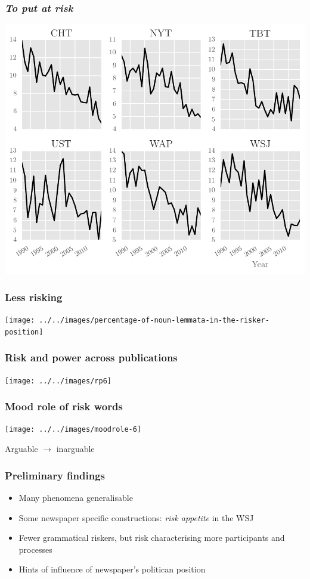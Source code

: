 \documentclass{beamer}       %
\begin{document}
\begin{frame}\frametitle{\emph{To put at risk}}
    \centering
    \includegraphics[width=1\textwidth]{../../images/to-run-risk}
\end{frame}

\begin{frame}\frametitle{Less risking}
    \centering
    \texttt{[image: ../../images/percentage-of-noun-lemmata-in-the-risker-position]}
\end{frame}

\begin{frame}\frametitle{Risk and power across publications}
    \centering
    \texttt{[image: ../../images/rp6]}
\end{frame}

\begin{frame}
    \frametitle{Mood role of risk words}
    \centering
    \texttt{[image: ../../images/moodrole-6]}

    Arguable $\rightarrow$ inarguable
\end{frame}


\begin{frame}\frametitle{Preliminary findings}
\begin{itemize}
    \item Many phenomena generalisable
    \item Some newspaper specific constructions: \emph{risk appetite} in the WSJ
    \item Fewer grammatical riskers, but risk characterising more participants and processes
    \item Hints of influence of newspaper's politican position
\end{itemize}
\end{frame}
\end{document}
